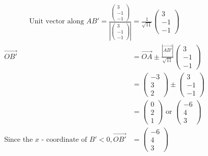 \documentclass[12pt, a4 paper]{article}
\begin{document}
\begin{outline}[enumerate]
					\begin{align*}
						{\textrm{Unit vector along }}AB' = \frac{{\left( {\begin{array}{*{20}{c}}3 \\{ - 1}\\{ - 1}\end{array}} \right)}}{{\left| {\left( {\begin{array}{*{20}{c}}3\\{ - 1}\\{ - 1}\end{array}} \right)} \right|}} = \frac{1}{{\sqrt {11} }}\left( {\begin{array}{*{20}{c}}3\\{ - 1}\\{ - 1}\end{array}} \right)
					\end{align*}
					\begin{align*}
						\overrightarrow {OB'} & = \overrightarrow {OA}  \pm \frac{{\left| {\overrightarrow {AB'} } \right|}}{{\sqrt {11} }}\left( {\begin{array}{*{20}{c}}3 \\{ - 1}\\{ - 1}\end{array}} \right)\\ &= \left( {\begin{array}{*{20}{c}}{ - 3}\\3\\2\end{array}} \right) \pm \left( {\begin{array}{*{20}{c}}3\\{ - 1}\\{ - 1}\end{array}} \right)\\ &= \left( {\begin{array}{*{20}{c}}0\\2\\1\end{array}} \right){\textrm{ or }}\left( {\begin{array}{*{20}{c}}{ - 6}\\4\\3\end{array}} \right)
						\\{\textrm{Since the }}x{\textrm{ - coordinate of }}B' < 0,\overrightarrow {OB'}  &= \left( {\begin{array}{*{20}{c}}{ - 6}\\4\\3\end{array}} \right)

\end{align*}
\end{outline}
\end{document}
